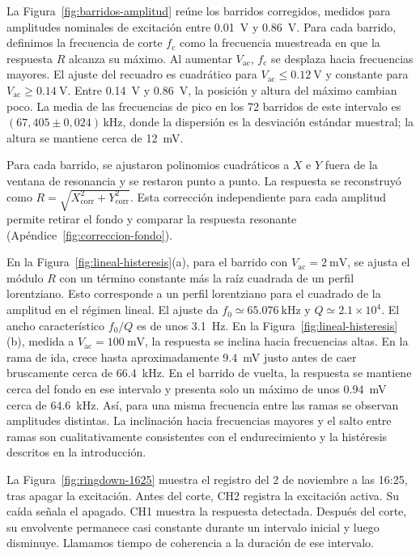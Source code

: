 La Figura~\ref{fig:barridos-amplitud} re\'une los barridos corregidos,
medidos para amplitudes nominales de excitaci\'on entre \SI{0.01}{\volt} y
\SI{0.86}{\volt}. Para cada barrido, definimos la frecuencia de corte
$f_{\mathrm{c}}$ como la frecuencia muestreada en que la respuesta $R$
alcanza su m\'aximo.
Al aumentar $V_{\mathrm{ac}}$, $f_{\mathrm{c}}$ se desplaza hacia frecuencias
mayores. El ajuste del recuadro es cuadr\'atico para
$V_{\mathrm{ac}}\le\SI{0.12}{\volt}$ y constante para
$V_{\mathrm{ac}}\ge\SI{0.14}{\volt}$. Entre \SI{0.14}{\volt} y
\SI{0.86}{\volt}, la posici\'on y altura del m\'aximo cambian poco. La
media de las frecuencias de pico en los 72 barridos de este intervalo es
\((67{,}405\pm0{,}024)\,\mathrm{kHz}\), donde la dispersi\'on es la
desviaci\'on est\'andar muestral; la altura se mantiene cerca de
\SI{12}{\milli\volt}.

Para cada barrido, se ajustaron polinomios cuadr\'aticos a $X$ e $Y$ fuera
de la ventana de resonancia y se restaron punto a punto. La respuesta se
reconstruy\'o como $R=\sqrt{X_{\mathrm{corr}}^2+Y_{\mathrm{corr}}^2}$.
Esta correcci\'on independiente para cada amplitud permite retirar el fondo
y comparar la respuesta resonante (Ap\'endice~\ref{fig:correccion-fondo}).

En la Figura~\ref{fig:lineal-histeresis}(a), para el barrido con
$V_{\mathrm{ac}}=\SI{2}{\milli\volt}$, se ajusta el m\'odulo $R$ con un t\'ermino
constante m\'as la ra\'iz cuadrada de un perfil lorentziano. Esto corresponde
a un perfil lorentziano para el cuadrado de la amplitud en el r\'egimen lineal.
El ajuste da $f_0\simeq\SI{65.076}{\kilo\hertz}$ y
$Q\simeq2.1\times10^4$. El ancho caracter\'istico $f_0/Q$ es de unos
\SI{3.1}{\hertz}. En la
Figura~\ref{fig:lineal-histeresis}(b), medida a
$V_{\mathrm{ac}}=\SI{100}{\milli\volt}$, la respuesta se inclina hacia
frecuencias altas. En la rama de ida, crece hasta aproximadamente
\SI{9.4}{\milli\volt} justo antes de caer bruscamente cerca de
\SI{66.4}{\kilo\hertz}. En el barrido de vuelta, la respuesta se mantiene
cerca del fondo en ese intervalo y presenta solo un máximo de unos
\SI{0.94}{\milli\volt} cerca de \SI{64.6}{\kilo\hertz}. Así, para una misma
frecuencia entre las ramas se observan amplitudes distintas. La inclinación
hacia frecuencias mayores y el salto entre ramas son cualitativamente
consistentes con el endurecimiento y la histéresis descritos en la
introducción.

La Figura~\ref{fig:ringdown-1625} muestra el registro del 2 de noviembre a
las 16:25, tras apagar la excitación. Antes del corte, CH2 registra la
excitación activa. Su caída señala el apagado. CH1 muestra la respuesta
detectada. Después del corte, su envolvente permanece casi constante durante
un intervalo inicial y luego disminuye. Llamamos tiempo de coherencia a la
duración de ese intervalo.

